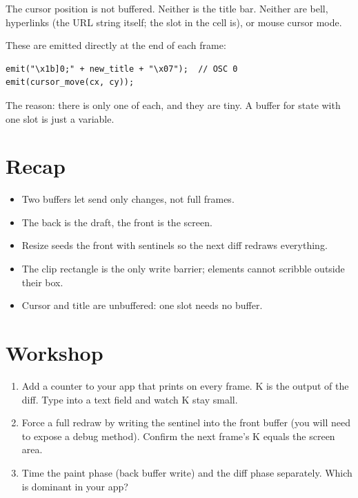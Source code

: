 The cursor position is not buffered. Neither is the title bar.
Neither are bell, hyperlinks (the URL string itself; the slot
in the cell is), or mouse cursor mode.

These are emitted directly at the end of each frame:

\begin{lstlisting}
emit("\x1b]0;" + new_title + "\x07");  // OSC 0
emit(cursor_move(cx, cy));
\end{lstlisting}

The reason: there is only one of each, and they are tiny. A
buffer for state with one slot is just a variable.

\section{Recap}

\begin{recap}
\begin{itemize}[leftmargin=*]
  \item Two buffers let \maya{} send only changes, not full
    frames.
  \item The back is the draft, the front is the screen.
  \item Resize seeds the front with sentinels so the next diff
    redraws everything.
  \item The clip rectangle is the only write barrier; elements
    cannot scribble outside their box.
  \item Cursor and title are unbuffered: one slot needs no
    buffer.
\end{itemize}
\end{recap}

\section*{Workshop}

\begin{enumerate}[leftmargin=*]
  \item Add a counter to your app that prints
     on every frame. K is the
    output of the diff. Type into a text field and watch K
    stay small.
  \item Force a full redraw by writing the sentinel into the
    front buffer (you will need to expose a debug method).
    Confirm the next frame's K equals the screen area.
  \item Time the paint phase (back buffer write) and the
    diff phase separately. Which is dominant in your app?
\end{enumerate}
